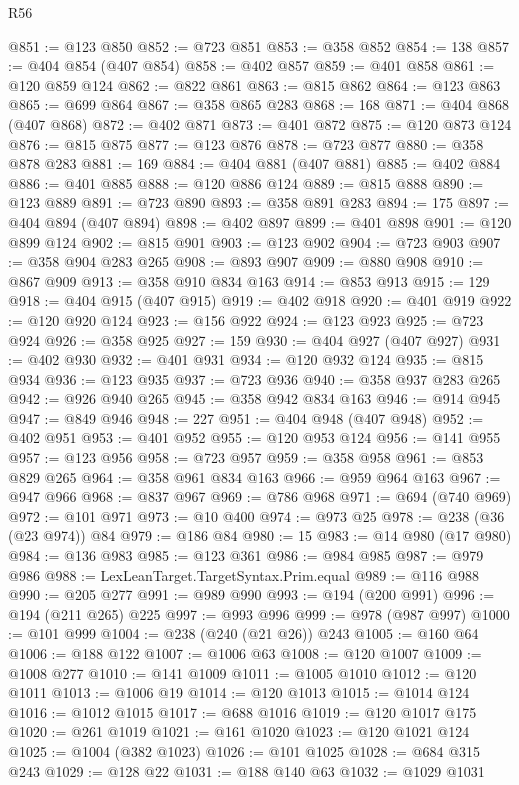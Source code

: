 \begin{lexlean}{R56}
\begin{coremodule}
@851 := @123 @850
@852 := @723 @851
@853 := @358 @852
@854 := 138
@857 := @404 @854 (@407 @854)
@858 := @402 @857
@859 := @401 @858
@861 := @120 @859 @124
@862 := @822 @861
@863 := @815 @862
@864 := @123 @863
@865 := @699 @864
@867 := @358 @865 @283
@868 := 168
@871 := @404 @868 (@407 @868)
@872 := @402 @871
@873 := @401 @872
@875 := @120 @873 @124
@876 := @815 @875
@877 := @123 @876
@878 := @723 @877
@880 := @358 @878 @283
@881 := 169
@884 := @404 @881 (@407 @881)
@885 := @402 @884
@886 := @401 @885
@888 := @120 @886 @124
@889 := @815 @888
@890 := @123 @889
@891 := @723 @890
@893 := @358 @891 @283
@894 := 175
@897 := @404 @894 (@407 @894)
@898 := @402 @897
@899 := @401 @898
@901 := @120 @899 @124
@902 := @815 @901
@903 := @123 @902
@904 := @723 @903
@907 := @358 @904 @283 @265
@908 := @893 @907
@909 := @880 @908
@910 := @867 @909
@913 := @358 @910 @834 @163
@914 := @853 @913
@915 := 129
@918 := @404 @915 (@407 @915)
@919 := @402 @918
@920 := @401 @919
@922 := @120 @920 @124
@923 := @156 @922
@924 := @123 @923
@925 := @723 @924
@926 := @358 @925
@927 := 159
@930 := @404 @927 (@407 @927)
@931 := @402 @930
@932 := @401 @931
@934 := @120 @932 @124
@935 := @815 @934
@936 := @123 @935
@937 := @723 @936
@940 := @358 @937 @283 @265
@942 := @926 @940 @265
@945 := @358 @942 @834 @163
@946 := @914 @945
@947 := @849 @946
@948 := 227
@951 := @404 @948 (@407 @948)
@952 := @402 @951
@953 := @401 @952
@955 := @120 @953 @124
@956 := @141 @955
@957 := @123 @956
@958 := @723 @957
@959 := @358 @958
@961 := @853 @829 @265
@964 := @358 @961 @834 @163
@966 := @959 @964 @163
@967 := @947 @966
@968 := @837 @967
@969 := @786 @968
@971 := @694 (@740 @969)
@972 := @101 @971
@973 := @10 @400
@974 := @973 @25
@978 := @238 (@36 (@23 @974)) @84
@979 := @186 @84
@980 := 15
@983 := @14 @980 (@17 @980)
@984 := @136 @983
@985 := @123 @361
@986 := @984 @985
@987 := @979 @986
@988 := LexLeanTarget.TargetSyntax.Prim.equal
@989 := @116 @988
@990 := @205 @277
@991 := @989 @990
@993 := @194 (@200 @991)
@996 := @194 (@211 @265) @225
@997 := @993 @996
@999 := @978 (@987 @997)
@1000 := @101 @999
@1004 := @238 (@240 (@21 @26)) @243
@1005 := @160 @64
@1006 := @188 @122
@1007 := @1006 @63
@1008 := @120 @1007
@1009 := @1008 @277
@1010 := @141 @1009
@1011 := @1005 @1010
@1012 := @120 @1011
@1013 := @1006 @19
@1014 := @120 @1013
@1015 := @1014 @124
@1016 := @1012 @1015
@1017 := @688 @1016
@1019 := @120 @1017 @175
@1020 := @261 @1019
@1021 := @161 @1020
@1023 := @120 @1021 @124
@1025 := @1004 (@382 @1023)
@1026 := @101 @1025
@1028 := @684 @315 @243
@1029 := @128 @22
@1031 := @188 @140 @63
@1032 := @1029 @1031

\end{coremodule}
\end{lexlean}
